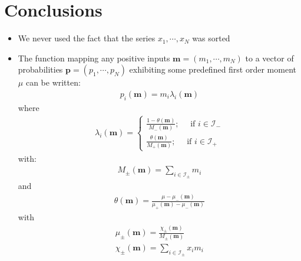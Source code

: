 \documentclass[10pt,a4paper]{article}
\begin{document}
\section{Conclusions}
\begin{itemize}
\item We never used the fact that the series $x_1, \cdots, x_N$ was sorted
\item The function mapping any positive inputs $\boldsymbol{m} = (m_1, \cdots, m_N)$ to a vector of probabilities $\boldsymbol{p} = (p_1, \cdots, p_N)$ exhibiting some predefined first order moment $\mu$ can be written:
\begin{align}
p_i (\boldsymbol{m}) = m_i \lambda_i(\boldsymbol{m})
\end{align}
where
\begin{align}
\lambda_i (\boldsymbol{m}) = 
\begin{cases}
\frac{1-\theta(\boldsymbol{m})}{M_- (\boldsymbol{m})} ; \quad \text{ if } i \in \mathcal{I}_-\\
\frac{\theta(\boldsymbol{m})}{M_+(\boldsymbol{m})} ; \quad \text{ if } i \in \mathcal{I}_+
\end{cases}
\end{align}
with:
\begin{align}
M_\pm  (\boldsymbol{m})= \sum_{i \in \mathcal{I}_\pm} m_i
\end{align}
and
\begin{align}
\theta(\boldsymbol{m}) = \frac{\mu - \mu_-(\boldsymbol{m})}{\mu_+(\boldsymbol{m}) - \mu_-(\boldsymbol{m})}
\end{align}
with
\begin{align}
\mu_\pm (\boldsymbol{m})= \frac{\chi_\pm (\boldsymbol{m})}{M_\pm (\boldsymbol{m})}\\
\chi_\pm (\boldsymbol{m}) = \sum_{i \in \mathcal{I}_\pm} x_i m_i
\end{align}

\end{itemize}
\end{document}
